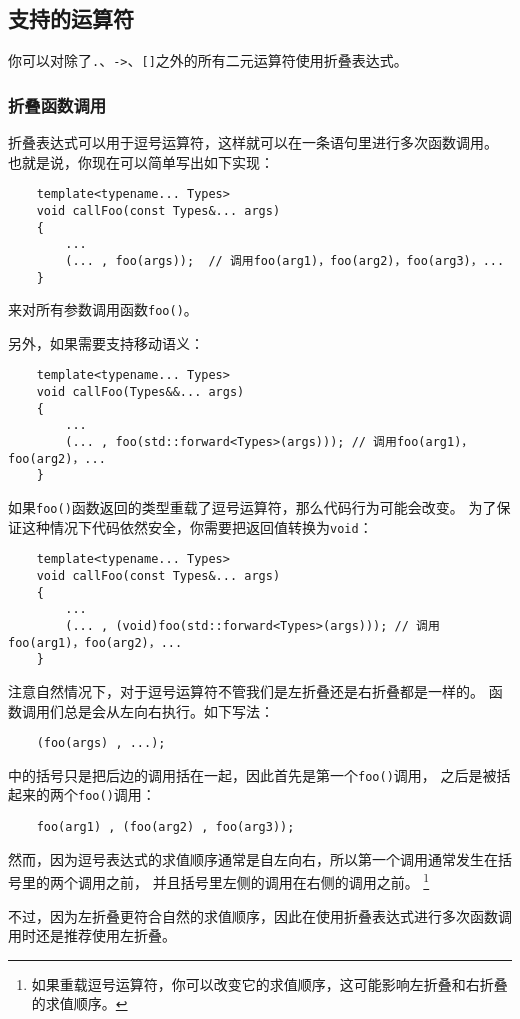 \subsection{支持的运算符}
你可以对除了\texttt{.}、\texttt{->}、\texttt{[]}之外的所有二元运算符使用折叠表达式。

\subsubsection{折叠函数调用}
折叠表达式可以用于逗号运算符，这样就可以在一条语句里进行多次函数调用。
也就是说，你现在可以简单写出如下实现：
\begin{lstlisting}
    template<typename... Types>
    void callFoo(const Types&... args)
    {
        ...
        (... , foo(args));  // 调用foo(arg1)，foo(arg2)，foo(arg3)，...
    }
\end{lstlisting}
来对所有参数调用函数\texttt{foo()}。

另外，如果需要支持移动语义：
\begin{lstlisting}
    template<typename... Types>
    void callFoo(Types&&... args)
    {
        ...
        (... , foo(std::forward<Types>(args))); // 调用foo(arg1)，foo(arg2)，...
    }
\end{lstlisting}

如果\texttt{foo()}函数返回的类型重载了逗号运算符，那么代码行为可能会改变。
为了保证这种情况下代码依然安全，你需要把返回值转换为\texttt{void}：
\begin{lstlisting}
    template<typename... Types>
    void callFoo(const Types&... args)
    {
        ...
        (... , (void)foo(std::forward<Types>(args))); // 调用foo(arg1)，foo(arg2)，...
    }
\end{lstlisting}
注意自然情况下，对于逗号运算符不管我们是左折叠还是右折叠都是一样的。
函数调用们总是会从左向右执行。如下写法：
\begin{lstlisting}
    (foo(args) , ...);
\end{lstlisting}
中的括号只是把后边的调用括在一起，因此首先是第一个\texttt{foo()}调用，
之后是被括起来的两个\texttt{foo()}调用：
\begin{lstlisting}
    foo(arg1) , (foo(arg2) , foo(arg3));
\end{lstlisting}
然而，因为逗号表达式的求值顺序通常是自左向右，所以第一个调用通常发生在括号里的两个调用之前，
并且括号里左侧的调用在右侧的调用之前。
\footnote{如果重载逗号运算符，你可以改变它的求值顺序，这可能影响左折叠和右折叠的求值顺序。}

不过，因为左折叠更符合自然的求值顺序，因此在使用折叠表达式进行多次函数调用时还是推荐使用左折叠。

